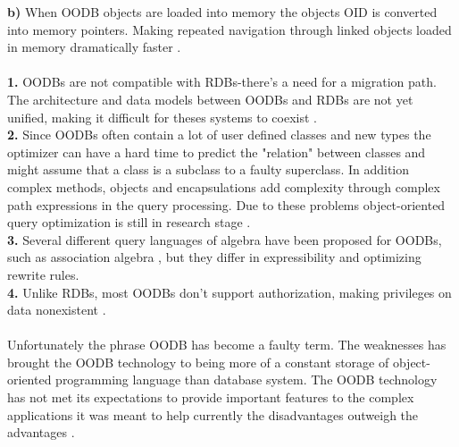 \documentclass{cslthse-msc}
\begin{document}
\textbf{b)} When OODB objects are loaded into memory the objects OID is converted into memory pointers. Making repeated navigation through linked objects loaded in memory dramatically faster \cite{userdefinedabstractions}.\\\\\textbf{1.} OODBs are not compatible with RDBs-there's a need for a migration path. The architecture and data models between OODBs and RDBs are not yet unified, making it difficult for theses systems to coexist \cite{userdefinedabstractions}. \\\textbf{2.} Since OODBs often contain a lot of user defined classes and new types the optimizer can have a hard time to predict the "relation" between classes and might assume that a class is a subclass to a faulty superclass. In addition complex methods, objects and encapsulations add complexity through complex path expressions in the query processing. Due to these problems object-oriented query optimization is still in research stage \cite{OODBqopt}. \\\textbf{3.} Several different query languages of algebra have been proposed for OODBs, such as association algebra \cite{associationalg}, but they differ in expressibility and optimizing rewrite rules. \\\textbf{4.} Unlike RDBs, most OODBs don't support authorization, making privileges on data nonexistent \cite{userdefinedabstractions}.\\\\
Unfortunately the phrase OODB has become a faulty term. The weaknesses has brought the OODB technology to being more of a constant storage of object-oriented programming language than database system. The OODB technology has not met its expectations to provide important features to the complex applications it was meant to help currently the disadvantages outweigh the advantages \cite{OODBMS}.   
\end{document}
